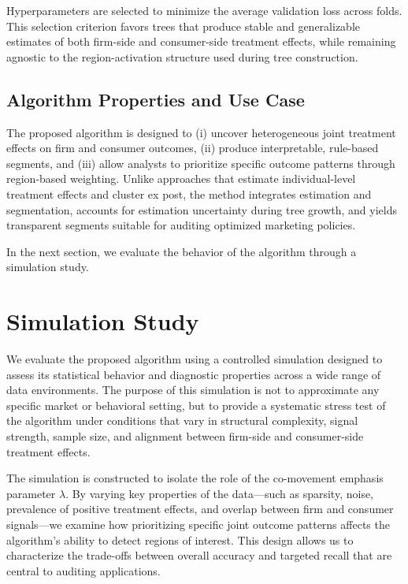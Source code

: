 \documentclass[11pt,letterpaper,english]{article}
\theoremstyle{definition}
\theoremstyle{definition}
\begin{document}
\begin{bibunit}
Hyperparameters are selected to minimize the average validation loss across folds. This selection criterion favors trees that produce stable and generalizable estimates of both firm-side and consumer-side treatment effects, while remaining agnostic to the region-activation structure used during tree construction.


\subsection{Algorithm Properties and Use Case}

The proposed algorithm is designed to (i) uncover heterogeneous joint treatment effects on firm and consumer outcomes, (ii) produce interpretable, rule-based segments, and (iii) allow analysts to prioritize specific outcome patterns through region-based weighting. Unlike approaches that estimate individual-level treatment effects and cluster ex post, the method integrates estimation and segmentation, accounts for estimation uncertainty during tree growth, and yields transparent segments suitable for auditing optimized marketing policies.

In the next section, we evaluate the behavior of the algorithm through a simulation study.

\section{Simulation Study}
\label{sec:simulation1}

We evaluate the proposed algorithm using a controlled simulation designed to assess its statistical behavior and diagnostic properties across a wide range of data environments. The purpose of this simulation is not to approximate any specific market or behavioral setting, but to provide a systematic stress test of the algorithm under conditions that vary in structural complexity, signal strength, sample size, and alignment between firm-side and consumer-side treatment effects.

The simulation is constructed to isolate the role of the co-movement emphasis parameter $\lambda$. By varying key properties of the data—such as sparsity, noise, prevalence of positive treatment effects, and overlap between firm and consumer signals—we examine how prioritizing specific joint outcome patterns affects the algorithm’s ability to detect regions of interest. This design allows us to characterize the trade-offs between overall accuracy and targeted recall that are central to auditing applications.


\end{bibunit}
\end{document}
